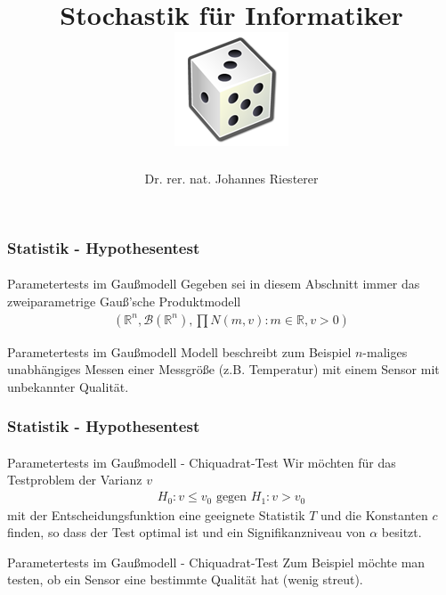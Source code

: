 \documentclass{beamer}
\begin{document}
\title[Stochastik] %
{Stochastik für Informatiker
\\
\includegraphics[scale=0.5]{img/craps}
}
\subtitle{}
\author[Dr. Johannes Riesterer] %
{Dr.  rer. nat. Johannes Riesterer}

\date[KPT 2004] %
{}

\subject{Stochastik}

\frame{\titlepage}






\begin{frame}
    \frametitle{Statistik - Hypothesentest}
\framesubtitle{}

\begin{block}{Parametertests im Gaußmodell}
Gegeben sei in diesem Abschnitt immer das zweiparametrige Gauß'sche Produktmodell
\begin{align*}
(\mathbb{R}^n, \mathcal{B}(\mathbb{R}^n), \prod N(m,v): m \in \mathbb{R}, v > 0 )
\end{align*}
\end{block}

\begin{block}{Parametertests im Gaußmodell}
Modell beschreibt zum Beispiel  $n$-maliges unabhängiges  Messen einer Messgröße (z.B. Temperatur) mit einem Sensor mit unbekannter Qualität. 
\end{block}


 \end{frame}


\begin{frame}
    \frametitle{Statistik - Hypothesentest}
\framesubtitle{}

\begin{block}{Parametertests im Gaußmodell - Chiquadrat-Test}
Wir möchten für das Testproblem der Varianz $v$ 
\begin{align*}
H_0: v \leq v_0 \text{ gegen } H_1: v > v_0
\end{align*}
mit der Entscheidungsfunktion 
 eine geeignete Statistik $T$ und die Konstanten $c$ finden, so dass 
der Test optimal ist und ein  Signifikanzniveau von $\alpha$ besitzt. 
\end{block}
\begin{block}{Parametertests im Gaußmodell - Chiquadrat-Test}
Zum Beispiel möchte man testen, ob ein Sensor eine bestimmte Qualität hat (wenig streut).
\end{block}


 \end{frame}
\end{document}
